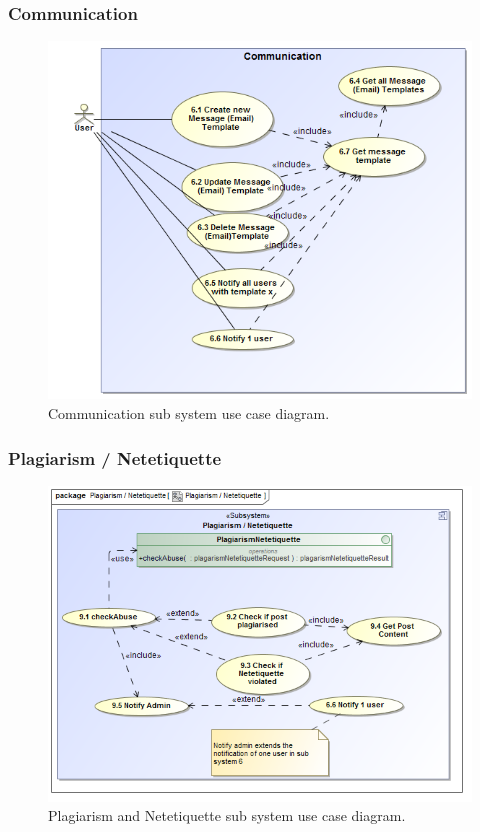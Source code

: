 \documentclass [a4paper,12pt] {article}
\begin{document}
		\subsubsection{Communication}
			\begin{figure}[H]
				\centering
				\includegraphics[width=1.0\textwidth]{CommunicationUC.png}
				\caption{Communication sub system use case diagram.}
			\end{figure}
		\subsubsection{Plagiarism / Netetiquette}
			\begin{figure}[H]
				\centering
				\includegraphics[width=1.0\textwidth]{PlagiarismNetetiquetteUC.png}
				\caption{Plagiarism and Netetiquette sub system use case diagram.}
			\end{figure}
\end{document}
